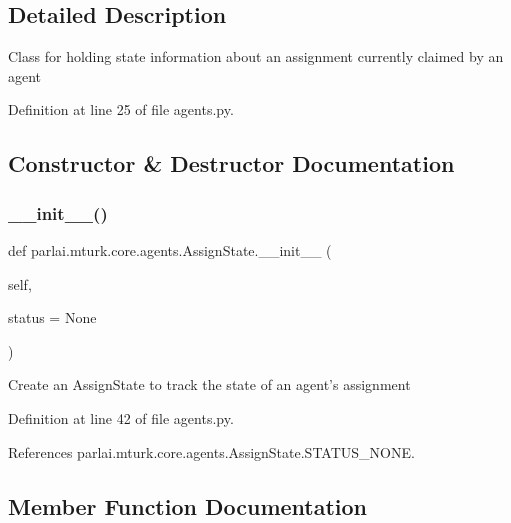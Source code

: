 \subsection{Detailed Description}
\begin{DoxyVerb}Class for holding state information about an assignment currently
claimed by an agent
\end{DoxyVerb}
 

Definition at line 25 of file agents.\+py.



\subsection{Constructor \& Destructor Documentation}
\mbox{\label{classparlai_1_1mturk_1_1core_1_1agents_1_1AssignState_aace503a7d51d513573c41ac25cd6510f}} 
\subsubsection{\texorpdfstring{\+\_\+\+\_\+init\+\_\+\+\_\+()}{\_\_init\_\_()}}
{\footnotesize\ttfamily def parlai.\+mturk.\+core.\+agents.\+Assign\+State.\+\_\+\+\_\+init\+\_\+\+\_\+ (\begin{DoxyParamCaption}\item[{}]{self,  }\item[{}]{status = {\ttfamily None} }\end{DoxyParamCaption})}

\begin{DoxyVerb}Create an AssignState to track the state of an agent's assignment\end{DoxyVerb}
 

Definition at line 42 of file agents.\+py.



References parlai.\+mturk.\+core.\+agents.\+Assign\+State.\+S\+T\+A\+T\+U\+S\+\_\+\+N\+O\+NE.



\subsection{Member Function Documentation}
\mbox{\label{classparlai_1_1mturk_1_1core_1_1agents_1_1AssignState_a655ebb0e19f6a1b66416848bc2abca27}} 
